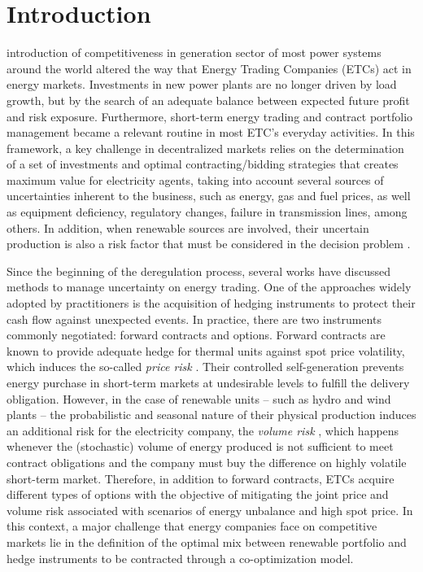 \section{Introduction}
\label{Introduction}

	 introduction of competitiveness in generation sector of most power systems around the world altered the way that Energy Trading Companies (ETCs) act in energy markets. Investments in new power plants are no longer driven by load growth, but by the search of an adequate balance between expected future profit and risk exposure. Furthermore, short-term energy trading and contract portfolio management became a relevant routine in most ETC's everyday activities. In this framework, a key challenge in decentralized markets relies on the determination of a set of investments and optimal contracting/bidding strategies that creates maximum value for electricity agents, taking into account several sources of uncertainties inherent to the business, such as energy, gas and fuel prices, as well as equipment deficiency, regulatory changes, failure in transmission lines, among others. In addition, when renewable sources are involved, their uncertain production is also a risk factor that must be considered in the decision problem \cite{RiskConstPortSelect}.

	Since the beginning of the deregulation process, several works have discussed methods to manage uncertainty on energy trading. One of the approaches widely adopted by practitioners is the acquisition of hedging instruments to protect their cash flow against unexpected events. In practice, there are two instruments commonly negotiated: forward contracts and options. Forward contracts are known to provide adequate hedge for thermal units against spot price volatility, which induces the so-called \textit{price risk} \cite{HedgingQtdRisk_Oren}. Their controlled self-generation prevents energy purchase in short-term markets at undesirable levels to fulfill the delivery obligation. However, in the case of renewable units -- such as hydro and wind plants -- the probabilistic and seasonal nature of their physical production induces an additional risk for the electricity company, the \textit{volume risk} \cite{HedgingQtdRisk_Oren}, which happens whenever the (stochastic) volume of energy produced is not sufficient to meet contract obligations and the company must buy the difference on highly volatile short-term market. Therefore, in addition to forward contracts, ETCs acquire different types of options with the objective of mitigating the joint price and volume risk associated with scenarios of energy unbalance and high spot price. In this context, a major challenge that energy companies face on competitive markets lie in the definition of the optimal mix between renewable portfolio and hedge instruments to be contracted through a co-optimization model.


